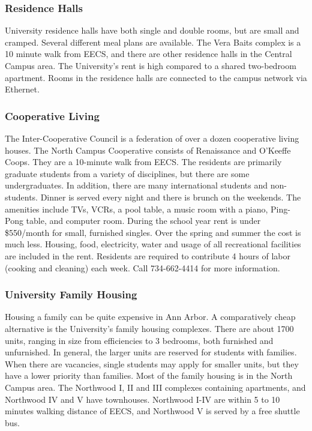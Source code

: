 \documentclass[11pt]{article}
\begin{document}
\subsubsection{Residence Halls}
\label{sec-10_1_1}

University residence halls have both single and double rooms, but are small and cramped. Several different meal plans are available. The Vera Baits complex is a 10 minute walk from EECS, and there are other residence halls in the Central Campus area. The University's rent is high compared to a shared two-bedroom apartment. Rooms in the residence halls are connected to the campus network via Ethernet.
\subsubsection{Cooperative Living}
\label{sec-10_1_2}

The Inter-Cooperative Council is a federation of over a dozen cooperative living houses.  The North Campus Cooperative consists of Renaissance and O’Keeffe Coops.  They are a 10-minute walk from EECS.  The residents are primarily graduate students from a variety of disciplines, but there are some undergraduates.  In addition, there are many international students and non-students.  Dinner is served every night and there is brunch on the weekends.  The amenities include TVs, VCRs, a pool table, a music room with a piano, Ping-Pong table, and computer room.  During the school year rent is under \$550/month for small, furnished singles.  Over the spring and summer the cost is much less.  Housing, food, electricity, water and usage of all recreational facilities are included in the rent.  Residents are required to contribute 4 hours of labor (cooking and cleaning) each week. Call 734-662-4414 for more information.
\subsubsection{University Family Housing}
\label{sec-10_1_3}

Housing a family can be quite expensive in Ann Arbor.  A comparatively cheap alternative is the University's family housing complexes.  There are about 1700 units, ranging in size from efficiencies to 3 bedrooms, both furnished and unfurnished.  In general, the larger units are reserved for students with families.  When there are vacancies, single students may apply for smaller units, but they have a lower priority than families.  Most of the family housing is in the North Campus area.  The Northwood I, II and III complexes containing apartments, and Northwood IV and V have townhouses.  Northwood I-IV are within 5 to 10 minutes walking distance of EECS, and Northwood V is served by a free shuttle bus.
\end{document}
